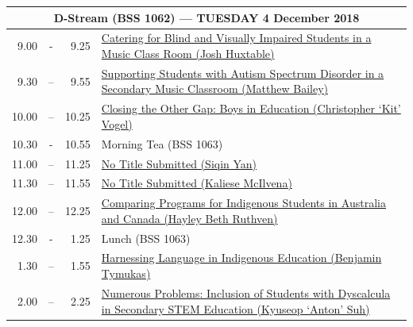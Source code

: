 \documentclass[twoside,12pt,a4paper,notitlepage]{memoir}
\begin{document}
\pagebreak
\begin{center}
\begin{tabular}{rcr|p{10.8cm}}
 \multicolumn{4}{c}{{\large D-Stream (BSS 1062) --- TUESDAY 4 December 2018}} \\ \hline
9.00 & - & 9.25 &
 \hyperref[aut:huxtable]{Catering for Blind and Visually Impaired Students in a Music Class Room (Josh Huxtable)} \\ \hline
9.30 & – & 9.55 &
 \hyperref[aut:bailey]{Supporting Students with Autism Spectrum Disorder in a Secondary Music Classroom (Matthew Bailey)} \\ \hline
10.00 & – & 10.25 &
\hyperref[aut:vogel]{Closing the Other Gap: Boys in Education (Christopher `Kit' Vogel)} \\ \hline
10.30 & - & 10.55 & Morning Tea (BSS 1063) \\ \hline
11.00 & – & 11.25 & 
 \hyperref[aut:yan]{No Title Submitted (Siqin Yan)} \\ \hline
11.30 & – & 11.55 &
 \hyperref[aut:mcilvena]{No Title Submitted (Kaliese McIlvena)} \\ \hline
12.00 & – & 12.25 &
 \hyperref[aut:ruthven]{Comparing Programs for Indigenous Students in Australia and Canada (Hayley Beth Ruthven)} \\ \hline
12.30 & - & 1.25 & Lunch (BSS 1063) \\ \hline
1.30 & – & 1.55 &
 \hyperref[aut:tymukas]{Harnessing Language in Indigenous Education (Benjamin Tymukas)} \\ \hline
2.00 & – & 2.25 & 
\hyperref[aut:suh]{Numerous Problems: Inclusion of Students with Dyscalcula in Secondary STEM Education (Kyuseop `Anton' Suh)} \\ \hline
\end{tabular}
\end{center}
\end{document}
